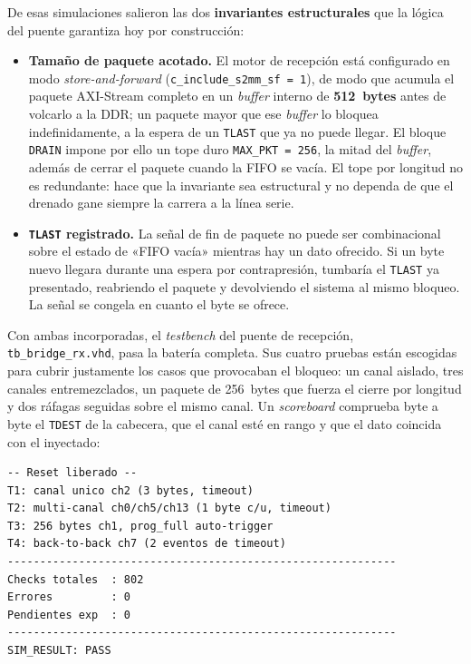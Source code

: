 De esas simulaciones salieron las dos \textbf{invariantes estructurales} que la lógica del puente
garantiza hoy por construcción:

\begin{itemize}
    \item \textbf{Tamaño de paquete acotado.} El motor de recepción está configurado en modo
    \textit{store-and-forward} (\texttt{c\_include\_s2mm\_sf~=~1}), de modo que acumula el paquete
    AXI-Stream completo en un \textit{buffer} interno de \textbf{512~bytes} antes de volcarlo a la
    DDR; un paquete mayor que ese \textit{buffer} lo bloquea indefinidamente, a la espera de un
    \texttt{TLAST} que ya no puede llegar. El bloque \texttt{DRAIN} impone por ello un tope duro
    \texttt{MAX\_PKT~=~256}, la mitad del \textit{buffer}, además de cerrar el paquete cuando la
    FIFO se vacía. El tope por longitud no es redundante: hace que la invariante sea estructural y
    no dependa de que el drenado gane siempre la carrera a la línea serie.
    \item \textbf{\texttt{TLAST} registrado.} La señal de fin de paquete no puede ser
    combinacional sobre el estado de «FIFO vacía» mientras hay un dato ofrecido. Si un byte nuevo
    llegara durante una espera por contrapresión, tumbaría el \texttt{TLAST} ya presentado,
    reabriendo el paquete y devolviendo el sistema al mismo bloqueo. La señal se congela en cuanto
    el byte se ofrece.
\end{itemize}

Con ambas incorporadas, el \textit{testbench} del puente de recepción,
\texttt{tb\_bridge\_rx.vhd}, pasa la batería completa. Sus cuatro pruebas están escogidas para
cubrir justamente los casos que provocaban el bloqueo: un canal aislado, tres canales
entremezclados, un paquete de 256~bytes que fuerza el cierre por longitud y dos ráfagas seguidas
sobre el mismo canal. Un \textit{scoreboard} comprueba byte a byte el \texttt{TDEST} de la
cabecera, que el canal esté en rango y que el dato coincida con el inyectado:

\begin{lstlisting}[style=terminal, caption={Salida de la simulación de \texttt{tb\_bridge\_rx.vhd}}]
-- Reset liberado --
T1: canal unico ch2 (3 bytes, timeout)
T2: multi-canal ch0/ch5/ch13 (1 byte c/u, timeout)
T3: 256 bytes ch1, prog_full auto-trigger
T4: back-to-back ch7 (2 eventos de timeout)
------------------------------------------------------------
Checks totales  : 802
Errores         : 0
Pendientes exp  : 0
------------------------------------------------------------
SIM_RESULT: PASS
\end{lstlisting}

